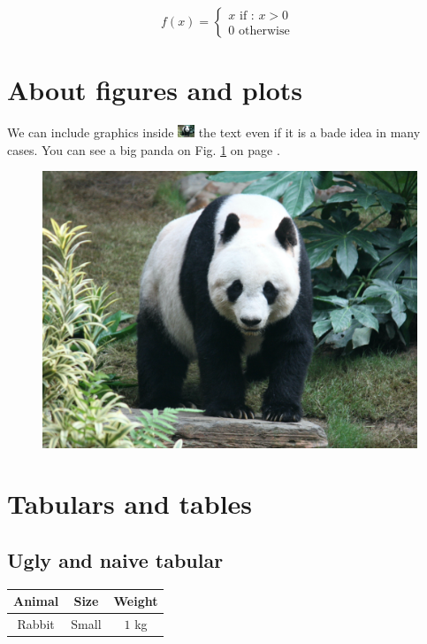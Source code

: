 \documentclass[10pt,a4paper]{article}
\begin{document}
\begin{equation}
    f(x) =
    \left\lbrace
    \begin{split}
        x \mbox{ if : } x > 0 \\
        0 \mbox { otherwise }
    \end{split}
    \right.
\end{equation}

\section{About figures and plots}

\blindtext[1]
We can include graphics inside
\includegraphics[width = 5mm]{figures/awesome_panda.jpeg}
the text even if it is a bade idea in many cases.
\blindtext[1]
You can see a big panda on Fig. \ref{fig:panda} on page \pageref{fig:panda}.

\begin{figure}
    \begin{center}
        \includegraphics[width = .5\textwidth]{figures/awesome_panda.jpeg}
    \end{center}
    \caption{\blindtext[1]}
    \label{fig:panda}
\end{figure}

\section{Tabulars and tables}

\subsection{Ugly and naive tabular}

\begin{tabular}{|c|c|c|}
    \hline
    \textbf{Animal} & \textbf{Size} & \textbf{Weight} \\
    \hline
    Rabbit          & Small         & $1$ kg          \\
    \hline
\end{tabular}
\end{document}
